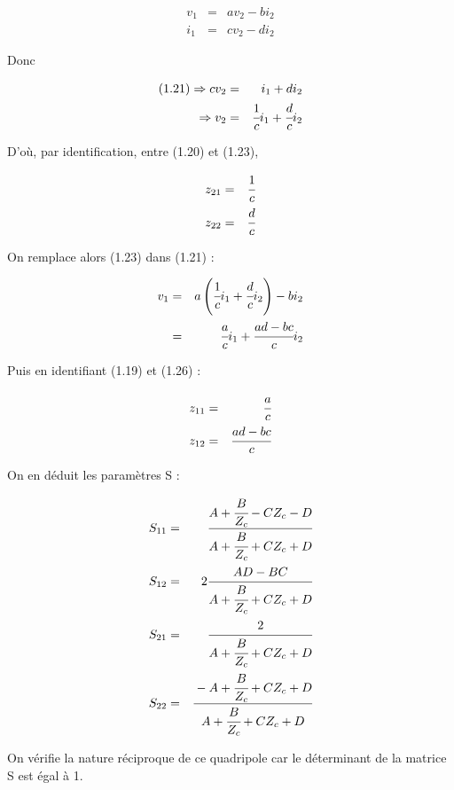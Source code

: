 \documentclass[10pt]{article}
\begin{document}
\begin{itemize}
        \begin{eqnarray}
            v_1 &=& a v_2 - b i_2 \\
            i_1 &=& c v_2 - d i_2
        \end{eqnarray}

        Donc

        \begin{eqnarray}
            (1.21) \Rightarrow c v_2 &=& i_1 + d i_2 \nonumber \\
            \Rightarrow v_2 &=& \cfrac{1}{c} i_1 + \cfrac{d}{c} i_2
        \end{eqnarray}

        D'où, par identification, entre (1.20) et (1.23), 

        \begin{eqnarray}
            z_{21} &=& \cfrac{1}{c} \\
            z_{22} &=& \cfrac{d}{c}
        \end{eqnarray}

        On remplace alors (1.23) dans (1.21) :

        \begin{eqnarray}
            v_1 &=& a \left( \cfrac{1}{c} i_1 + \cfrac{d}{c} i_2 \right) - b i_2 \nonumber \\
            &=& \cfrac{a}{c} i_1 + \cfrac{a d - b c}{c} i_2
        \end{eqnarray}

        Puis en identifiant (1.19) et (1.26) :

        \begin{eqnarray}
            z_{11} &=& \cfrac{a}{c} \\
            z_{12} &=& \cfrac{a d - b c}{c}
        \end{eqnarray}

        On en déduit les paramètres S :

        \begin{eqnarray}
            S_{11} &=& \cfrac{A + \cfrac{B}{Z_c} - C Z_c - D}{A+\cfrac{B}{Z_c} +C Z_c +D} \\
            S_{12} &=& 2 \cfrac{A D - B C}{A+\cfrac{B}{Z_c} +C Z_c +D} \\
            S_{21} &=& \cfrac{2}{A+\cfrac{B}{Z_c} +C Z_c +D} \\
            S_{22} &=& \cfrac{-A +\cfrac{B}{Z_c} + C Z_c +D}{A+\cfrac{B}{Z_c} +C Z_c +D}
        \end{eqnarray}

        On vérifie la nature réciproque de ce quadripole car le déterminant de la matrice S est égal à 1.


\end{itemize}
\end{document}
